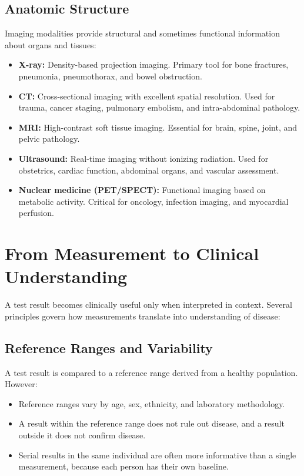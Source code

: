 \subsection{Anatomic Structure}

Imaging modalities provide structural and sometimes functional information about organs and tissues:

\begin{itemize}
    \item \textbf{X-ray:} Density-based projection imaging. Primary tool for bone fractures, pneumonia, pneumothorax, and bowel obstruction.
    \item \textbf{CT:} Cross-sectional imaging with excellent spatial resolution. Used for trauma, cancer staging, pulmonary embolism, and intra-abdominal pathology.
    \item \textbf{MRI:} High-contrast soft tissue imaging. Essential for brain, spine, joint, and pelvic pathology.
    \item \textbf{Ultrasound:} Real-time imaging without ionizing radiation. Used for obstetrics, cardiac function, abdominal organs, and vascular assessment.
    \item \textbf{Nuclear medicine (PET/SPECT):} Functional imaging based on metabolic activity. Critical for oncology, infection imaging, and myocardial perfusion.
\end{itemize}

\clearpage
\section{From Measurement to Clinical Understanding}

A test result becomes clinically useful only when interpreted in context. Several principles govern how measurements translate into understanding of disease:

\subsection{Reference Ranges and Variability}

A test result is compared to a reference range derived from a healthy population. However:
\begin{itemize}
    \item Reference ranges vary by age, sex, ethnicity, and laboratory methodology.
    \item A result within the reference range does not rule out disease, and a result outside it does not confirm disease.
    \item Serial results in the same individual are often more informative than a single measurement, because each person has their own baseline.
\end{itemize}

